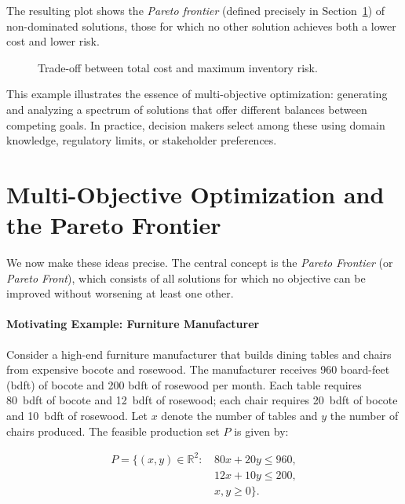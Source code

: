 The resulting plot shows the \emph{Pareto frontier} (defined precisely in Section~\ref{sec:pareto-frontier}) of non-dominated solutions, those for which no other solution achieves both a lower cost and lower risk.

\begin{figure}[h]
    \centering
    \caption{Trade-off between total cost and maximum inventory risk.}
\end{figure}

This example illustrates the essence of multi-objective optimization: generating and analyzing a spectrum of solutions that offer different balances between competing goals. In practice, decision makers select among these using domain knowledge, regulatory limits, or stakeholder preferences.

\section{Multi-Objective Optimization and the Pareto Frontier}
\label{sec:pareto-frontier}

We now make these ideas precise. The central concept is the \emph{Pareto Frontier} (or \emph{Pareto Front}), which consists of all solutions for which no objective can be improved without worsening at least one other.

\paragraph{Motivating Example: Furniture Manufacturer}

Consider a high-end furniture manufacturer that builds dining tables and chairs from expensive bocote and rosewood.
The manufacturer receives 960 board-feet (bdft) of bocote and 200 bdft of rosewood per month. Each table requires 80~bdft of bocote and 12~bdft of rosewood; each chair requires 20~bdft of bocote and 10~bdft of rosewood. Let \(x\) denote the number of tables and \(y\) the number of chairs produced. The feasible production set \(P\) is given by:

\[
\begin{aligned}
P = \{(x,y) \in \mathbb{R}^2 :\,& 80x + 20y \le 960,\\
                                   & 12x + 10y \le 200,\\
                                   & x, y \ge 0 \}.
\end{aligned}
\]

